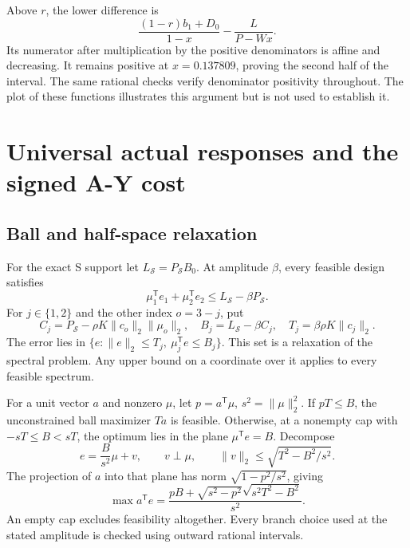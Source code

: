 \documentclass[9pt]{osa-supplemental-document}
\begin{document}
Above $r$, the lower difference is
\begin{equation}
 \frac{(1-r)b_1+D_0}{1-x}-\frac{L}{P-Wx}.
\end{equation}
Its numerator after multiplication by the positive denominators is affine and decreasing. It remains positive at $x=0.137809$, proving the second half of the interval. The same rational checks verify denominator positivity throughout. The plot of these functions illustrates this argument but is not used to establish it.

\section{Universal actual responses and the signed A-Y cost}
\subsection{Ball and half-space relaxation}
For the exact S support let $L_{\mathcal S}=P_{\mathcal S}B_0$. At amplitude $\beta$, every feasible design satisfies
\begin{equation}
 \mu_1^{\mathsf T}e_1+\mu_2^{\mathsf T}e_2\leq L_{\mathcal S}-\beta P_{\mathcal S}.
\end{equation}
For $j\in\{1,2\}$ and the other index $o=3-j$, put
\begin{equation}
 C_j=P_{\mathcal S}-\rho K\|c_o\|_2\|\mu_o\|_2,
 \quad B_j=L_{\mathcal S}-\beta C_j,
 \quad T_j=\beta\rho K\|c_j\|_2.
\end{equation}
The error lies in $\{e:\|e\|_2\leq T_j,\ \mu_j^{\mathsf T}e\leq B_j\}$. This set is a relaxation of the spectral problem. Any upper bound on a coordinate over it applies to every feasible spectrum.

For a unit vector $a$ and nonzero $\mu$, let $p=a^{\mathsf T}\mu$, $s^2=\|\mu\|_2^2$. If $pT\leq B$, the unconstrained ball maximizer $Ta$ is feasible. Otherwise, at a nonempty cap with $-sT\leq B<sT$, the optimum lies in the plane $\mu^{\mathsf T}e=B$. Decompose
\begin{equation}
 e=\frac{B}{s^2}\mu+v,\qquad v\perp\mu,\qquad
 \|v\|_2\leq\sqrt{T^2-B^2/s^2}.
\end{equation}
The projection of $a$ into that plane has norm $\sqrt{1-p^2/s^2}$, giving
\begin{equation}
 \max a^{\mathsf T}e=\frac{pB+\sqrt{s^2-p^2}\sqrt{s^2T^2-B^2}}{s^2}.
\end{equation}
An empty cap excludes feasibility altogether. Every branch choice used at the stated amplitude is checked using outward rational intervals.
\end{document}
